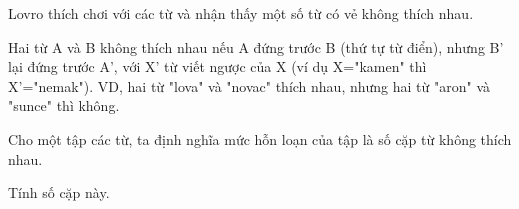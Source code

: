 Lovro thích chơi với các từ và nhận thấy một số từ có vẻ không thích nhau.




Hai từ A và B không thích nhau nếu A đứng trước B (thứ tự từ điển), nhưng B' lại đứng trước A', với X' từ viết ngược của X (ví dụ X="kamen" thì X'="nemak"). VD, hai từ "lova" và "novac" thích nhau, nhưng hai từ "aron" và "sunce" thì không.

Cho một tập các từ, ta định nghĩa mức hỗn loạn của tập là số cặp từ không thích nhau.

Tính số cặp này.
